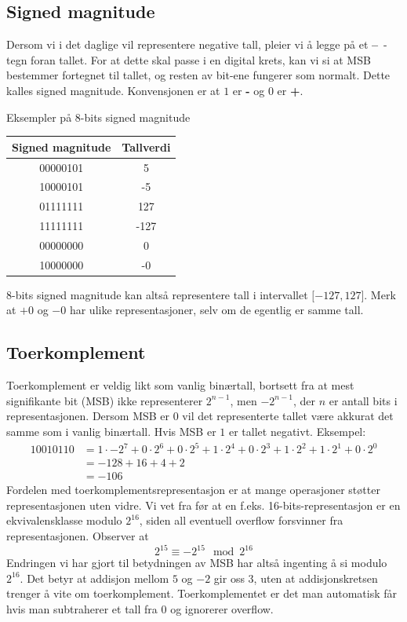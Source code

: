 \documentclass[12pt,a4paper,norsk]{article}
\begin{document}
\subsection{Signed magnitude}
Dersom vi i det daglige vil representere negative tall, pleier vi å legge på et
\textbf{--}~-tegn foran tallet. For at dette skal passe i en digital krets, kan vi
si at MSB bestemmer fortegnet til tallet, og resten av bit-ene fungerer som
normalt. Dette kalles signed magnitude. Konvensjonen er at $1$ er \textbf{-} og
$0$ er \textbf{+}.
\begin{center}
  Eksempler på 8-bits signed magnitude\\[5mm]
  \begin{tabular}{c|c}
    \toprule
    Signed magnitude & Tallverdi \\
    \midrule
    00000101 & 5 \\
    10000101 & -5 \\
    01111111 & 127 \\
    11111111 & -127 \\
    00000000 & 0 \\
    10000000 & -0 \\
    \bottomrule
  \end{tabular}
\end{center}

8-bits signed magnitude kan altså representere tall i intervallet $\lbrack-127, 127\rbrack$.
Merk at $+0$ og $-0$ har ulike representasjoner, selv om de egentlig er samme tall.

\subsection{Toerkomplement}
Toerkomplement er veldig likt som vanlig binærtall, bortsett fra at mest
signifikante bit (MSB) ikke representerer $2^{n-1}$, men $-2^{n-1}$, der $n$ er
antall bits i representasjonen. Dersom MSB er $0$ vil det representerte tallet være
akkurat det samme som i vanlig binærtall. Hvis MSB er $1$ er tallet negativt.
Eksempel:
%
\begin{align*}
  10010110 &= 1 \cdot -2^7 + 0 \cdot 2^6 + 0 \cdot 2^5 + 1 \cdot 2^4 + 0 \cdot 2^3 + 1 \cdot 2^2 + 1 \cdot 2^1 + 0 \cdot 2^0 \\
             &= -128 + 16 + 4 + 2 \\
             &= -106
\end{align*}
%
Fordelen med toerkomplementsrepresentasjon er at mange operasjoner støtter
representasjonen uten vidre. Vi vet fra før at en f.eks. 16-bits-representasjon
er en ekvivalensklasse modulo $2^{16}$, siden all eventuell overflow forsvinner
fra representasjonen. Observer at
\[2^{15} \equiv -2^{15} \mod 2^{16}\]
Endringen vi har gjort til betydningen av MSB har altså ingenting å si modulo
$2^{16}$. Det betyr at addisjon mellom $5$ og $-2$ gir oss $3$, uten at
addisjonskretsen trenger å vite om toerkomplement. Toerkomplementet er det man
automatisk får hvis man subtraherer et tall fra $0$ og ignorerer overflow.
\end{document}
